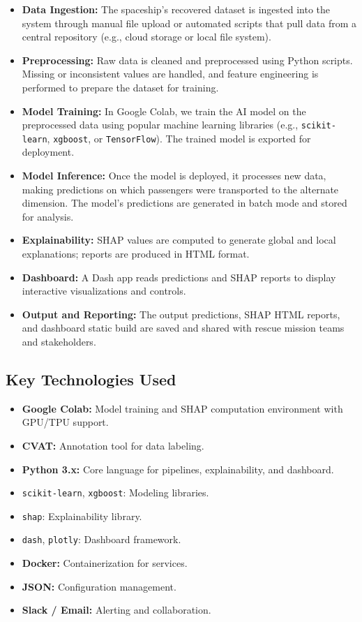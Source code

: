 \documentclass[15pt]{article}
\begin{document}
\begin{itemize}
    \item \textbf{Data Ingestion:} The spaceship’s recovered dataset is ingested into the system through manual file upload or automated scripts that pull data from a central repository (e.g., cloud storage or local file system).
    \item \textbf{Preprocessing:} Raw data is cleaned and preprocessed using Python scripts. Missing or inconsistent values are handled, and feature engineering is performed to prepare the dataset for training.
    \item \textbf{Model Training:} In Google Colab, we train the AI model on the preprocessed data using popular machine learning libraries (e.g., \texttt{scikit-learn}, \texttt{xgboost}, or \texttt{TensorFlow}). The trained model is exported for deployment.
    \item \textbf{Model Inference:} Once the model is deployed, it processes new data, making predictions on which passengers were transported to the alternate dimension. The model’s predictions are generated in batch mode and stored for analysis.
    \item \textbf{Explainability:} SHAP values are computed to generate global and local explanations; reports are produced in HTML format.
    \item \textbf{Dashboard:} A Dash app reads predictions and SHAP reports to display interactive visualizations and controls.
    \item \textbf{Output and Reporting:} The output predictions, SHAP HTML reports, and dashboard static build are saved and shared with rescue mission teams and stakeholders.
\end{itemize}

\subsection{Key Technologies Used}
\begin{itemize}
    \item \textbf{Google Colab:} Model training and SHAP computation environment with GPU/TPU support.
    \item \textbf{CVAT:} Annotation tool for data labeling.
    \item \textbf{Python 3.x:} Core language for pipelines, explainability, and dashboard.
    \item \texttt{scikit-learn}, \texttt{xgboost}: Modeling libraries.
    \item \texttt{shap}: Explainability library.
    \item \texttt{dash}, \texttt{plotly}: Dashboard framework.
    \item \textbf{Docker:} Containerization for services.
    \item \textbf{JSON:} Configuration management.
    \item \textbf{Slack / Email:} Alerting and collaboration.
\end{itemize}
\end{document}
